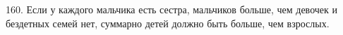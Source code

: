 160. Если у каждого мальчика есть сестра, мальчиков больше, чем девочек и бездетных семей нет, суммарно детей должно быть больше, чем взрослых.\\
